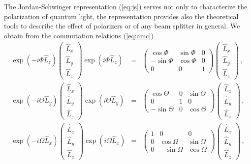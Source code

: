 \documentclass[12pt,amsmath,amssymb]{article}
\numberwithin{equation}{section}
\begin{document}
The Jordan-Schwinger representation (\ref{eq:js}) serves not only
to characterize the polarization of quantum light, the
representation provides also the theoretical tools to describe
the effect of polarizers or of any beam splitter in general. We
obtain from the commutation relations (\ref{eq:amc})
\begin{eqnarray}
\exp(-i\Phi\hat{L}_z) \left(
    \begin{array}{c}
     \hat{L}_x \\
     \hat{L}_y \\
     \hat{L}_z
    \end{array}
\right) \exp(i\Phi\hat{L}_z) &=& \left(
    \begin{array}{ccc}
      \cos\Phi & \sin\Phi & 0\\
      -\sin\Phi & \cos\Phi & 0\\
      0 & 0 & 1
    \end{array}
\right) \left(
    \begin{array}{c}
     \hat{L}_x \\
     \hat{L}_y \\
     \hat{L}_z
    \end{array}
\right)\,, \nonumber\\
\exp(-i\Theta\hat{L}_y) \left(
    \begin{array}{c}
     \hat{L}_x \\
     \hat{L}_y \\
     \hat{L}_z
    \end{array}
\right) \exp(i\Theta\hat{L}_y) &=& \left(
    \begin{array}{ccc}
      \cos\Theta & 0 & \sin\Theta\\
      0 & 1 & 0\\
      -\sin\Theta & 0 & \cos\Theta
    \end{array}
\right) \left(
    \begin{array}{c}
     \hat{L}_x \\
     \hat{L}_y \\
     \hat{L}_z
    \end{array}
\right)\,, \nonumber\\
\exp(-i\Omega\hat{L}_x) \left(
    \begin{array}{c}
     \hat{L}_x \\
     \hat{L}_y \\
     \hat{L}_z
    \end{array}
\right) \exp(i\Omega\hat{L}_x) &=& \left(
    \begin{array}{ccc}
      1 & 0 & 0\\
      0 & \cos\Omega & \sin\Omega\\
      0 & -\sin\Omega & \cos\Omega
    \end{array}
\right) \left(
    \begin{array}{c}
     \hat{L}_x \\
     \hat{L}_y \\
     \hat{L}_z
    \end{array}
\right)\,,
\label{eq:poincarerot}
\end{eqnarray}
\end{document}

